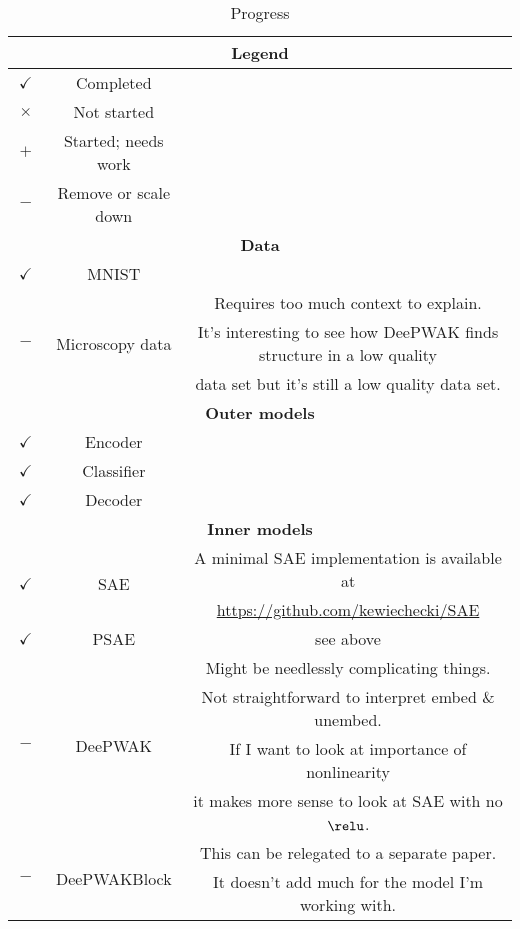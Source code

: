 \begin{longtable}{c|c|c}
    \caption{Progress}
    \label{tab:plan}
    
    \hline
    \multicolumn{3}{c}{\textbf{Legend}} \\
    \hline
    $\boxed{\checkmark}$ & Completed & \\
    \hline
    $\boxed{\times}$ & Not started & \\
    \hline
    $\boxed{+}$ & Started; needs work & \\
    \hline
    $\boxed{-}$ & Remove or scale down & \\
    
    \hline
    \multicolumn{3}{c}{\textbf{Data}} \\
    \hline
    $\boxed{\checkmark}$ & MNIST & \\ 
    \hline
    \multirow{3}{*}{$\boxed{-}$} & \multirow{3}{*}{Microscopy data} & 
    Requires too much context to explain. \\
    & & It's interesting to see how DeePWAK finds structure in a low quality \\
    & & data set but it's still a low quality data set. \\
    
    \hline
    \multicolumn{3}{c}{\textbf{Outer models}} \\
    \hline
    $\boxed{\checkmark}$ & Encoder & \\
    \hline
    $\boxed{\checkmark}$ & Classifier & \\
    \hline
    $\boxed{\checkmark}$ & Decoder & \\

    \hline
    \multicolumn{3}{c}{\textbf{Inner models}} \\
    \hline
    \multirow{2}{*}{$\boxed{\checkmark}$} & \multirow{2}{*}{SAE} &
    A minimal SAE implementation is available at \\
    & & \url{https://github.com/kewiechecki/SAE} \\
    \hline
    $\boxed{\checkmark}$ & PSAE & see above \\
    \hline
    \multirow{4}{*}{$\boxed{-}$} &  \multirow{4}{*}{DeePWAK} &
    Might be needlessly complicating things. \\
    & & Not straightforward to interpret embed \& unembed. \\
    & & If I want to look at importance of nonlinearity \\
    & & it makes more sense to look at SAE with no $\relu$. \\
    \hline
    \multirow{2}{*}{$\boxed{-}$} & \multirow{2}{*}{DeePWAKBlock} &
    This can be relegated to a separate paper. \\
    & & It doesn't add much for the model I'm working with. \\
    \hline


\end{longtable}
